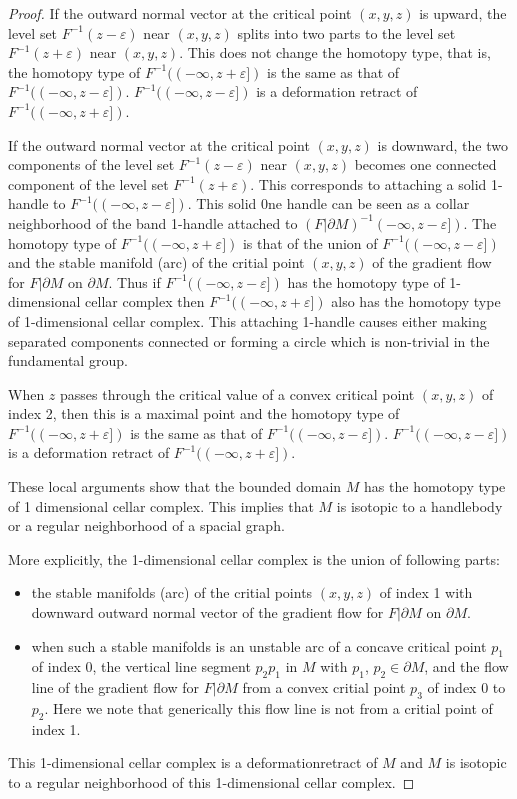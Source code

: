 \documentclass[10pt,a4paper]{amsart}
\newcommand{\bd}{\partial}
\begin{document}
\begin{proof}
If the outward normal vector at the critical point $(x,y,z)$ is upward, the level set $F^{-1}(z-\varepsilon)$ near $(x,y,z)$ splits into two parts to the level set $F^{-1}(z+\varepsilon)$ near $(x,y,z)$. This does not change the homotopy type, that is, the homotopy type of $F^{-1}((-\infty,z+\varepsilon])$ is the same as that of  $F^{-1}((-\infty,z-\varepsilon])$. $F^{-1}((-\infty,z-\varepsilon])$ is a deformation retract of $F^{-1}((-\infty,z+\varepsilon])$.

If the outward normal vector at the critical point $(x,y,z)$ is downward, the two components of the level set $F^{-1}(z-\varepsilon)$ near $(x,y,z)$ becomes one connected component of the level set $F^{-1}(z+\varepsilon)$. This corresponds to attaching a solid 1-handle to $F^{-1}((-\infty,z-\varepsilon])$. This solid 0ne handle can be seen as a collar neighborhood of the band 1-handle attached to $(F|\bd M)^{-1}(-\infty,z-\varepsilon])$. 
The homotopy type of $F^{-1}((-\infty,z+\varepsilon])$ is that of the union of 
  $F^{-1}((-\infty,z-\varepsilon])$ and the stable manifold (arc) of the critial point $(x,y,z)$ of the gradient flow for $F|\bd M$ on $\bd M$. Thus if  $F^{-1}((-\infty,z-\varepsilon])$ has the homotopy type of 1-dimensional cellar complex then  $F^{-1}((-\infty,z+\varepsilon])$ also has the homotopy type of 1-dimensional cellar complex.  This attaching 1-handle causes either making separated components connected or forming a circle which is non-trivial in the fundamental group. 

When $z$ passes through the critical value of a convex critical point $(x,y,z)$ of index 2, then this is a maximal point and the homotopy type of $F^{-1}((-\infty,z+\varepsilon])$ is the same as that of  $F^{-1}((-\infty,z-\varepsilon])$. $F^{-1}((-\infty,z-\varepsilon])$ is a deformation retract of $F^{-1}((-\infty,z+\varepsilon])$.

These local arguments show that the bounded domain $M$ has the homotopy type of 1 dimensional cellar complex. This implies that $M$ is isotopic to a handlebody or a regular neighborhood of a spacial graph. 

More explicitly, 
the 1-dimensional cellar complex is the union of following parts:
\begin{itemize}
\item 
the stable manifolds (arc) of the critial points  $(x,y,z)$ of index 1 with downward outward normal vector of the gradient flow for $F|\bd M$ on $\bd M$.
\item
when such a stable manifolds is an unstable arc of a concave critical point $p_1$ of index 0, the vertical line segment $p_2p_1$ in $M$ with $p_1$, $p_2\in \bd M$, and the flow line of the gradient flow for $F|\bd M$ from a convex critial point $p_3$ of index 0 to $p_2$. Here we note that generically this flow line is not from a critial point of index 1.
\end{itemize}

This 1-dimensional cellar complex is a deformationretract of $M$ and $M$ is isotopic to a regular neighborhood of this 1-dimensional cellar complex.
\end{proof}
\end{document}
